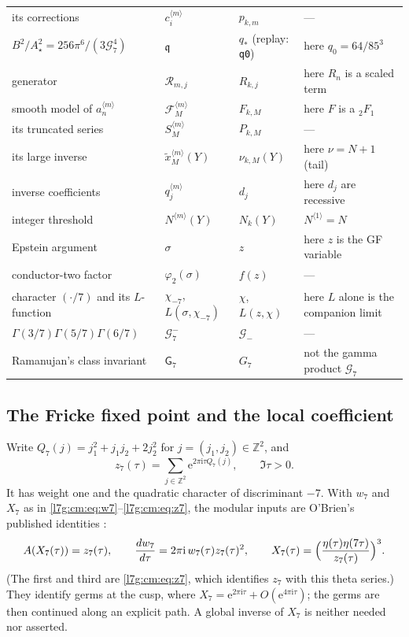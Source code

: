 \documentclass[11pt,letterpaper]{article}
\theoremstyle{remark}\newtheorem{remark}[theorem]{Remark}
\newcommand{\G}{\mathcal G_7}\newcommand{\Ast}{A_\star}
\newcommand{\ii}{\mathrm i}\newcommand{\ee}{\mathrm e}
\newcommand{\Gm}{\mathcal G_7^{-}}\newcommand{\qq}{\mathfrak q}
\newcounter{l7gtrsavedeq}
\begin{document}
\begin{center}
\begin{longtable}{p{}p{}p{}p{}}
its corrections & $c_i^{\langle m\rangle}$ & $p_{k,m}$ & ---\\
$B^2/\Ast^2=256\pi^6/(3\G^4)$ & $\qq$ & $q_*$ (replay: \texttt{q0}) & here $q_0=64/85^3$\\
generator & $\mathcal R_{m,j}$ & $R_{k,j}$ & here $R_n$ is a scaled term\\
smooth model of $a_n^{\langle m\rangle}$ & $\mathcal F_M^{\langle m\rangle}$ & $F_{k,M}$ & here $F$ is a ${}_2F_1$\\
its truncated series & $S_M^{\langle m\rangle}$ & $P_{k,M}$ & ---\\
its large inverse & $\tilde x_M^{\langle m\rangle}(Y)$ & $\nu_{k,M}(Y)$ & here $\nu=N+1$ (tail)\\
inverse coefficients & $q_j^{\langle m\rangle}$ & $d_j$ & here $d_j$ are recessive\\
integer threshold & $N^{\langle m\rangle}(Y)$ & $N_k(Y)$ & $N^{\langle1\rangle}=N$\\
Epstein argument & $\sigma$ & $z$ & here $z$ is the GF variable\\
conductor-two factor & $\varphi_2(\sigma)$ & $f(z)$ & ---\\
character $(\cdot/7)$ and its $L$-function & $\chi_{-7}$, $L(\sigma,\chi_{-7})$ & $\chi$, $L(z,\chi)$ & here $L$ alone is the companion limit\\
$\Gamma(3/7)\Gamma(5/7)\Gamma(6/7)$ & $\Gm$ & $\mathcal G_-$ & ---\\
Ramanujan's class invariant & $\mathsf G_7$ & $G_7$ & not the gamma product $\G$\\
\bottomrule
\end{longtable}
\end{center}

\subsection{The Fricke fixed point and the local coefficient}\label{l7g:tr:sec:fricke}
Write $Q_7(j)=j_1^2+j_1j_2+2j_2^2$ for $j=(j_1,j_2)\in\mathbb Z^2$, and
\begin{equation}\label{l7g:tr:eq:theta}
 z_7(\tau)=\sum_{j\in\mathbb Z^2}\ee^{2\pi\ii\tau Q_7(j)},\qquad \Im\tau>0.
\end{equation}
It has weight one and the quadratic character of discriminant $-7$. With
$w_7$ and $X_7$ as in \eqref{l7g:cm:eq:w7}--\eqref{l7g:cm:eq:z7}, the
modular inputs are O'Brien's published identities \cite[Theorems 3.7, 3.8,
3.10, 4.6 and 6.1]{l7g:obrien}:
\begin{equation}\label{l7g:tr:eq:inputs}
 A(X_7(\tau))=z_7(\tau),\qquad
 \frac{dw_7}{d\tau}=2\pi\ii\,w_7(\tau)z_7(\tau)^2,\qquad
 X_7(\tau)=\Bigl(\frac{\eta(\tau)\eta(7\tau)}{z_7(\tau)}\Bigr)^3.
\end{equation}
(The first and third are \eqref{l7g:cm:eq:z7}, which identifies $z_7$ with
this theta series.) They identify germs at the cusp, where
$X_7=\ee^{2\pi\ii\tau}+O(\ee^{4\pi\ii\tau})$; the germs are then continued
along an explicit path. A global inverse of $X_7$ is neither needed nor
asserted.
\end{document}
